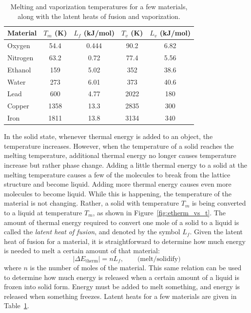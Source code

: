 \begin{table}
\begin{center}
\begin{tabular}{lcccc}
\hline\hline
Material & $T_m$ (K) & $L_f$ (kJ/mol) & $T_v$ (K) & $L_v$ (kJ/mol) \\ \hline
\noalign{}
Oxygen & 54.4 & 0.444 & 90.2 & 6.82 \\
Nitrogen & 63.2 & 0.72 & 77.4 & 5.56 \\
Ethanol & 159 & 5.02 & 352 & 38.6 \\
Water & 273 & 6.01 & 373 & 40.6  \\ 
Lead & 600 & 4.77 & 2022 & 180 \\
Copper & 1358 & 13.3 & 2835 & 300 \\
Iron  & 1811 & 13.8 & 3134 & 340 \\
\hline\hline
\end{tabular}


\caption{Melting and vaporization temperatures for a few materials, along
with the latent heats of fusion and vaporization.}
\label{table:phase_transitions}
\end{center}
\end{table}

In the solid state, whenever thermal energy is added to an object, the
temperature increases.  However, when the temperature of a solid
reaches the melting temperature, additional thermal energy no longer
causes temperature increase but rather phase change.  Adding a little
thermal energy to a solid at the melting temperature causes a few of
the molecules to break from the lattice structure and become liquid.
Adding more thermal energy causes even more molecules to become
liquid.  While this is happening, the temperature of the material is
not changing.  Rather, a solid with temperature $T_m$ is being
converted to a liquid at temperature $T_m$, as shown in
Figure~\ref{fig:etherm_vs_t}.  The amount of thermal energy required to
convert one mole of a solid to a liquid is called the \textit{latent heat
  of fusion}, and denoted by the symbol $L_f$.  Given the latent heat
of fusion for a material, it is straightforward to determine how much
energy is needed to melt a certain amount of that material:
\begin{equation}
|\Delta E_\text{therm}| = nL_f,\qquad\text{(melt/solidify)}
\label{eq:latent_heat}
\end{equation}
where $n$ is the number of moles of the material.  This same relation
can be used to determine how much energy is released when a certain
amount of a liquid is frozen into solid form.  Energy must be added to
melt something, and energy is released when something freezes.  Latent
heats for a few materials are given in
Table~\ref{table:phase_transitions}.




